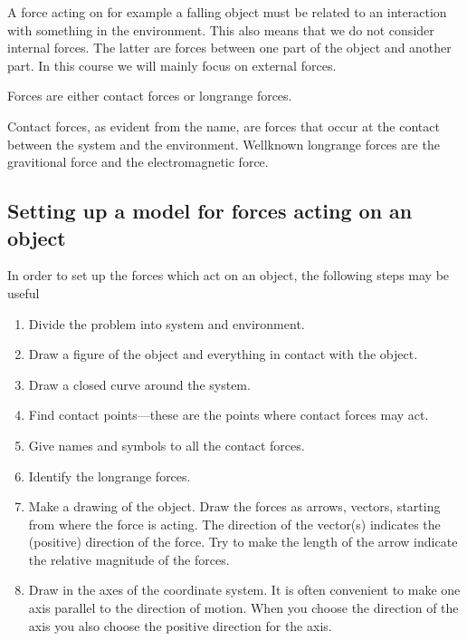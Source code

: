 \documentclass[letterpaper,10pt,english]{sphinxmanual}
\begin{document}
A force acting on for example a falling object must be related to an interaction with something in the environment.
This also means that we do not consider internal forces. The latter are forces between
one part of the object and another part. In this course we will mainly focus on external forces.

Forces are either contact forces or long\sphinxhyphen{}range forces.

Contact forces, as evident from the name, are forces that occur at the contact between
the system and the environment. Well\sphinxhyphen{}known long\sphinxhyphen{}range forces are the gravitional force and the electromagnetic force.


\subsection{Setting up a model for forces acting on an object}
\label{\detokenize{chapter3:setting-up-a-model-for-forces-acting-on-an-object}}
In order to set up the forces which act on an object, the following steps may be useful
\begin{enumerate}
%
\item {} 
Divide the problem into system and environment.

\item {} 
Draw a figure of the object and everything in contact with the object.

\item {} 
Draw a closed curve around the system.

\item {} 
Find contact points—these are the points where contact forces may act.

\item {} 
Give names and symbols to all the contact forces.

\item {} 
Identify the long\sphinxhyphen{}range forces.

\item {} 
Make a drawing of the object. Draw the forces as arrows, vectors, starting from where the force is acting. The direction of the vector(s) indicates the (positive) direction of the force. Try to make the length of the arrow indicate the relative magnitude of the forces.

\item {} 
Draw in the axes of the coordinate system. It is often convenient to make one axis parallel to the direction of motion. When you choose the direction of the axis you also choose the positive direction for the axis.

\end{enumerate}
\end{document}
